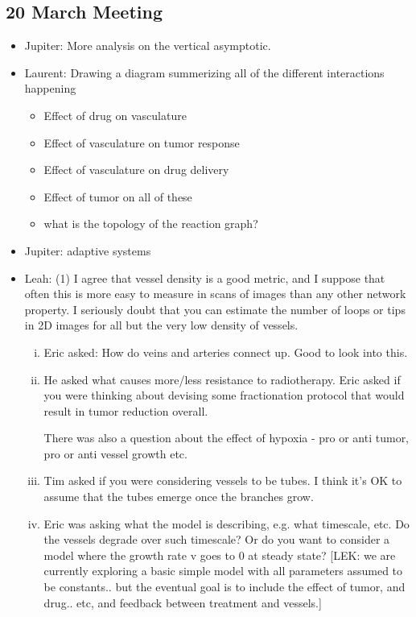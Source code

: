 \subsection{20 March Meeting}
\begin{itemize}
	\item Jupiter: More analysis on the vertical asymptotic.
	\item Laurent: Drawing a diagram summerizing all of the different interactions happening
	\begin{itemize}
		\item Effect of drug on vasculature
		\item Effect of vasculature on tumor response
		\item Effect of vasculature on drug delivery
		\item Effect of tumor on all of these
		\item what is the topology of the reaction graph?
	\end{itemize}
	\item Jupiter: adaptive systems
	\item Leah: (1) I agree that vessel density is a good metric, and I suppose that often this is more easy to measure in scans of images than any other network property. I seriously doubt that you can estimate the number of loops or tips in 2D images for all but the very low density of vessels.
	\begin{enumerate}[(i)]
	
	\item Eric asked: How do veins and arteries connect up. Good to look into this.
	
	
	
	\item He asked what causes more/less resistance to radiotherapy. Eric asked if you were thinking about devising some fractionation protocol that would result in tumor reduction overall.
	
	There was also a question about the effect of hypoxia - pro or anti tumor, pro or anti vessel growth etc.
	
	\item Tim asked if you were considering vessels to be tubes. I think it's OK to assume that the tubes emerge once the branches grow.
	
	\item Eric was asking what the model is describing, e.g. what timescale, etc. Do the vessels degrade over such timescale? Or do you want to consider a model where the growth rate v goes to 0 at steady state? [LEK: we are currently exploring a basic simple model with all parameters assumed to be constants.. but the eventual goal is to include the effect of tumor, and drug.. etc, and feedback between treatment and vessels.]
	

\end{enumerate}
\end{itemize}
